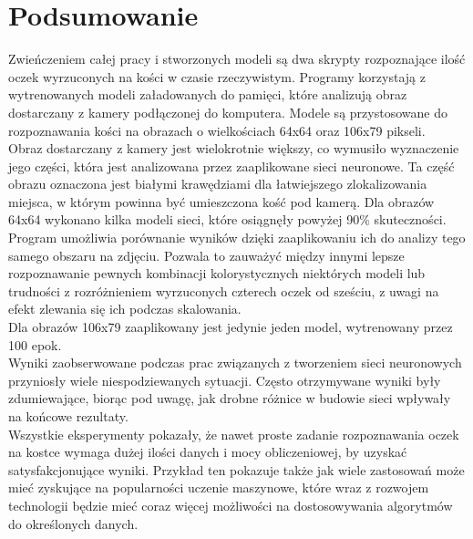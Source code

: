 
\chapter{Podsumowanie}

Zwieńczeniem całej pracy i stworzonych modeli są dwa skrypty rozpoznające ilość
oczek wyrzuconych na kości w czasie rzeczywistym. Programy korzystają z wytrenowanych
modeli załadowanych do pamięci, które analizują obraz dostarczany z kamery
podłączonej do komputera. Modele są przystosowane do rozpoznawania kości na
obrazach o wielkościach 64x64 oraz 106x79 pikseli.\\
Obraz dostarczany z kamery jest wielokrotnie większy, co wymusiło wyznaczenie jego
części, która jest analizowana przez zaaplikowane sieci neuronowe. Ta część obrazu
oznaczona jest białymi krawędziami dla łatwiejszego zlokalizowania miejsca, w którym
powinna być umieszczona kość pod kamerą.
Dla obrazów 64x64 wykonano kilka modeli sieci, które osiągnęły powyżej 90\% skuteczności.
Program umożliwia porównanie wyników dzięki zaaplikowaniu ich do analizy tego
samego obszaru na zdjęciu. Pozwala to zauważyć między innymi lepsze rozpoznawanie
pewnych kombinacji kolorystycznych niektórych modeli lub trudności z rozróżnieniem
wyrzuconych czterech oczek od sześciu, z uwagi na efekt zlewania się ich podczas
skalowania.\\
Dla obrazów 106x79 zaaplikowany jest jedynie jeden model, wytrenowany przez 100 epok.\\
Wyniki zaobserwowane podczas prac związanych z tworzeniem sieci neuronowych przyniosły
wiele niespodziewanych sytuacji. Często otrzymywane wyniki były zdumiewające,
biorąc pod uwagę, jak drobne różnice w budowie sieci wpływały na końcowe rezultaty.\\
Wszystkie eksperymenty pokazały, że nawet proste zadanie rozpoznawania oczek na kostce
wymaga dużej ilości danych i mocy obliczeniowej, by uzyskać satysfakcjonujące wyniki.
Przykład ten pokazuje także jak wiele zastosowań może mieć zyskujące na popularności
uczenie maszynowe, które wraz z rozwojem technologii będzie mieć coraz więcej możliwości
na dostosowywania algorytmów do określonych danych.
